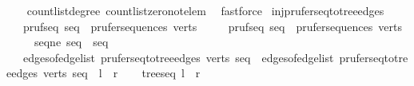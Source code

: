 \begin{isabellebody}
%
\isadelimproof
\ \ %
\endisadelimproof
%
\isatagproof
{}\isamarkupfalse%
\ count{\isacharunderscore}{\kern0pt}list{\isacharunderscore}{\kern0pt}degree\ count{\isacharunderscore}{\kern0pt}list{\isacharunderscore}{\kern0pt}zero{\isacharunderscore}{\kern0pt}not{\isacharunderscore}{\kern0pt}elem\ \isamarkupfalse%
\ fastforce%
\endisatagproof
{\isafoldproof}%
%
\isadelimproof
\isanewline
%
\endisadelimproof
\isanewline
{}\isamarkupfalse%
\ inj{\isacharunderscore}{\kern0pt}prufer{\isacharunderscore}{\kern0pt}seq{\isacharunderscore}{\kern0pt}to{\isacharunderscore}{\kern0pt}tree{\isacharunderscore}{\kern0pt}edges{\isacharcolon}{\kern0pt}\isanewline
\ \ \ pruf{\isacharunderscore}{\kern0pt}seq{}{\isacharcolon}{\kern0pt}\ {\isachardoublequoteopen}seq{}\ {\isasymin}\ prufer{\isacharunderscore}{\kern0pt}sequences\ verts{\isachardoublequoteclose}\isanewline
\ \ \ \ \ pruf{\isacharunderscore}{\kern0pt}seq{}{\isacharcolon}{\kern0pt}\ {\isachardoublequoteopen}seq{}\ {\isasymin}\ prufer{\isacharunderscore}{\kern0pt}sequences\ verts{\isachardoublequoteclose}\isanewline
\ \ \ \ \ seq{\isacharunderscore}{\kern0pt}ne{\isacharcolon}{\kern0pt}\ {\isachardoublequoteopen}seq{}\ {\isasymnoteq}\ seq{}{\isachardoublequoteclose}\isanewline
\ \ \ {\isachardoublequoteopen}edges{\isacharunderscore}{\kern0pt}of{\isacharunderscore}{\kern0pt}edge{\isacharunderscore}{\kern0pt}list\ {\isacharparenleft}{\kern0pt}prufer{\isacharunderscore}{\kern0pt}seq{\isacharunderscore}{\kern0pt}to{\isacharunderscore}{\kern0pt}tree{\isacharunderscore}{\kern0pt}edges\ verts\ seq{}{\isacharparenright}{\kern0pt}\ {\isasymnoteq}\ edges{\isacharunderscore}{\kern0pt}of{\isacharunderscore}{\kern0pt}edge{\isacharunderscore}{\kern0pt}list\ {\isacharparenleft}{\kern0pt}prufer{\isacharunderscore}{\kern0pt}seq{\isacharunderscore}{\kern0pt}to{\isacharunderscore}{\kern0pt}tree{\isacharunderscore}{\kern0pt}edges\ verts\ seq{}{\isacharparenright}{\kern0pt}{\isachardoublequoteclose}\ {\isacharparenleft}{\kern0pt}\ {\isachardoublequoteopen}{\isacharquery}{\kern0pt}l\ {\isasymnoteq}\ {\isacharquery}{\kern0pt}r{\isachardoublequoteclose}{\isacharparenright}{\kern0pt}\isanewline
%
\isadelimproof
%
\endisadelimproof
%
\isatagproof
{}\isamarkupfalse%
\isanewline
\ \ \isamarkupfalse%
\ trees{\isacharunderscore}{\kern0pt}eq{\isacharcolon}{\kern0pt}\ {\isachardoublequoteopen}{\isacharquery}{\kern0pt}l\ {\isacharequal}{\kern0pt}\ {\isacharquery}{\kern0pt}r{\isachardoublequoteclose}\isanewline

\end{isabellebody}
